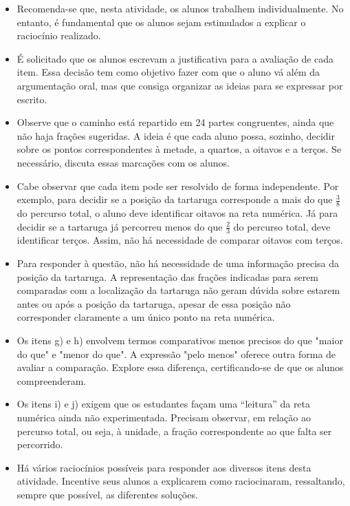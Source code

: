 \begin{multicols}{2}
\begin{itemize} %
    \item       Recomenda-se que, nesta atividade, os alunos trabalhem individualmente. No entanto, é fundamental que os alunos sejam estimulados a explicar o raciocínio realizado.
    \item       É solicitado que os alunos escrevam a justificativa para a avaliação de cada item. Essa decisão tem como objetivo fazer com que o aluno vá além da argumentação oral, mas que consiga organizar as ideias para se expressar por escrito. 
    \item       Observe que o caminho está repartido em 24 partes congruentes, ainda que não haja frações sugeridas. A ideia é que cada aluno possa, sozinho, decidir sobre os pontos correspondentes à metade, a quartos, a oitavos e a terços. Se necessário, discuta essas marcações com os alunos. 
    \item       Cabe observar que cada item pode ser resolvido de forma independente. Por exemplo, para decidir se a posição da tartaruga corresponde a mais do que       $\frac{3}{8}$       do percurso total, o aluno deve identificar oitavos na reta numérica. Já para decidir se a tartaruga já percorreu menos do que       $\frac{2}{3}$       do percurso total, deve identificar terços. Assim, não há necessidade de comparar oitavos com terços.
    \item       Para responder à questão, não há necessidade de uma informação precisa da posição da tartaruga. A representação das frações indicadas para serem comparadas com a localização da tartaruga não geram dúvida sobre estarem antes ou após a posição da tartaruga, apesar de essa posição não corresponder claramente a um único ponto na reta numérica.   
    \item       Os itens g) e h) envolvem termos comparativos menos precisos do que "maior do que" e "menor do que". A expressão       "pelo menos"       oferece outra forma de avaliar a comparação. Explore essa diferença, certificando-se de que os alunos compreenderam.
    \item       Os itens i) e j) exigem que os estudantes façam uma       ``leitura''       da reta numérica ainda não experimentada. Precisam observar, em relação ao percurso total, ou seja, à unidade, a fração correspondente ao que falta ser percorrido. 
    \item       Há vários raciocínios possíveis para responder aos diversos itens desta atividade. Incentive seus alunos a explicarem como raciocinaram, ressaltando, sempre que possível, as diferentes soluções. 
\end{itemize} %
  


\end{multicols}
